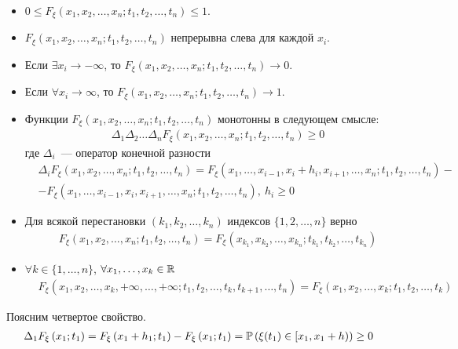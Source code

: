 \begin{itemize}
    \item $0 \leq F_\xi \left( x_1, x_2, \dots, x_n; t_1, t_2, \dots, t_n
    \right) \leq 1$.
    \item $F_\xi \left( x_1, x_2, \dots, x_n; t_1, t_2, \dots, t_n \right)$
    непрерывна слева для каждой $x_i$.
    \item Если $\exists x_i \to -\infty$, то $F_\xi \left( x_1, x_2, \dots, x_n;
        t_1, t_2, \dots, t_n \right) \to 0$.
    \item Если $\forall x_i \to \infty$, то $F_\xi \left( x_1, x_2, \dots, x_n;
        t_1, t_2, \dots, t_n \right) \to 1$.
    \item Функции $F_\xi \left( x_1, x_2, \dots, x_n; t_1, t_2, \dots, t_n
    \right)$ монотонны в следующем смысле:
    \begin{align*}
      & \Delta_1 \Delta_2 \dots \Delta_n F_\xi \left( x_1, x_2, \dots, x_n; t_1, t_2, \dots, t_n \right) \geq 0
    \end{align*}
    где $\Delta_i$~--- оператор конечной разности
    \begin{align*}
      & \Delta_i F_\xi \left( x_1, x_2, \dots, x_n; t_1, t_2, \dots, t_n \right) = F_\xi \left( x_1, \dots, x_{i-1}, x_i + h_i, x_{i+1}, \dots, x_n; t_1, t_2, \dots, t_n \right) -\\
      & - F_\xi \left( x_1, \dots, x_{i-1}, x_i, x_{i+1}, \dots, x_n; t_1, t_2, \dots, t_n \right), \ h_i \geq 0
    \end{align*}
    \item Для всякой перестановки $\left(k_1, k_2, \dots, k_n\right)$ индексов
    $\{1, 2, \dots, n\}$ верно
    \begin{align*}
      & F_\xi \left( x_1, x_2, \dots, x_n; t_1, t_2, \dots, t_n \right) = F_\xi \left( x_{k_1}, x_{k_2}, \dots, x_{k_n}; t_{k_1}, t_{k_2}, \dots, t_{k_n} \right)
    \end{align*}
    \item $\forall k \in \{1, \dots, n\}$, $\forall x_1, \dots, x_k \in \mathbb{R}$
    \begin{align*}
      & F_\xi \left( x_1, x_2, \dots, x_k, +\infty, \dots, +\infty; t_1, t_2, \dots, t_k, t_{k+1}, \dots, t_n \right) = F_\xi \left( x_1, x_2, \dots, x_k; t_1, t_2, \dots, t_k \right)
    \end{align*}   
\end{itemize}
Поясним четвертое свойство.
\begin{align*}
  & \Delta_1 F_\xi \left( x_1; t_1\right) = F_\xi \left( x_1+h_1; t_1\right) - F_\xi \left( x_1; t_1\right) = \mathbb{P}\left( \xi(t_1) \in [x_1, x_1+h) \right) \geq 0
\end{align*}
